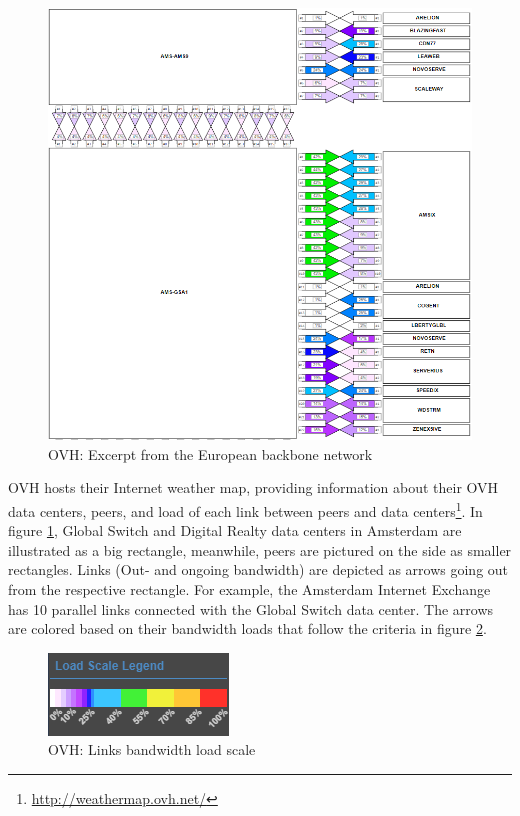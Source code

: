 \documentclass[sigconf,authorversion,nonacm]{acmart}
\begin{document}
\begin{figure}[H]
    \centering
    \includegraphics[width=\linewidth]{OVH/ovh.png}
    \caption{OVH: Excerpt from the European backbone network}
    \label{OVH: Excerpt from the European backbone network}
\end{figure}
OVH hosts their Internet weather map, providing information about their OVH data centers, peers, and load of each link between peers and data centers\footnote{\url{http://weathermap.ovh.net/}}. In figure \ref{OVH: Excerpt from the European backbone network}, Global Switch and Digital Realty data centers in Amsterdam are illustrated as a big rectangle, meanwhile, peers are pictured on the side as smaller rectangles. Links (Out- and ongoing bandwidth) are depicted as arrows going out from the respective rectangle. For example, the Amsterdam Internet Exchange has 10 parallel links connected with the Global Switch data center. The arrows are colored based on their bandwidth loads that follow the criteria in figure \ref{OVH: Links bandwidth load scale}.
\begin{figure}[H]
    \centering
    \includegraphics{OVH/scale.png}
    \caption{OVH: Links bandwidth load scale}
    \label{OVH: Links bandwidth load scale}
\end{figure}
\end{document}
